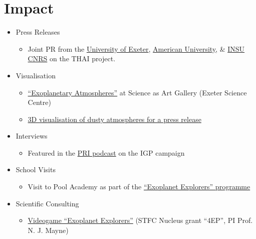 \documentclass[a4paper, 11pt]{article}
\begin{document}
\section{Impact}
\begin{itemize}[nosep, leftmargin=10pt]
    \item Press Releases
    \begin{itemize}
        \item Joint PR from the \href{https://www.exeter.ac.uk/research/news/articles/questtouncoverintricacies.html}{University of Exeter}, \href{https://www.american.edu/news/20220811-trappist-1.cfm}{American University}, \& \href{https://www.insu.cnrs.fr/fr/cnrsinfo/la-quete-pour-percer-le-mystere-des-climats-de-planetes-similaires-la-terre-avance}{INSU CNRS} on the THAI project.
    \end{itemize}
    \item Visualisation
    \begin{itemize}
        \item \href{https://exetersciencecentre.org/gallery/denis_sergeev_uoe_exoplanets/}{``Exoplanetary Atmospheres''} at Science as Art Gallery (Exeter Science Centre)
        \item \href{https://phys.org/news/2020-06-presence-airborne-signify-habitability-distant.html}{3D visualisation of dusty atmospheres for a press release}
    \end{itemize}
    \item Interviews
    \begin{itemize}
        \item Featured in the \href{https://theworld.org/stories/2018-08-03/sea-and-sky-scientists-brave-wicked-weather-explore-key-ocean-current}{PRI podcast} on the IGP campaign
    \end{itemize}
    \item School Visits
    \begin{itemize}
        \item Visit to Pool Academy as part of the \href{https://physics-astronomy.exeter.ac.uk/exoplanetexplorers/}{``Exoplanet Explorers'' programme}
    \end{itemize}
    \item Scientific Consulting
    \begin{itemize}
        \item \href{https://www.wethecurious.org/curious-stuff/stargazing-night-sky/exoplanet-explorers}{Videogame ``Exoplanet Explorers''} (STFC Nucleus grant ``4EP'', PI Prof. N. J. Mayne)
    \end{itemize}

\end{itemize}
\end{document}
